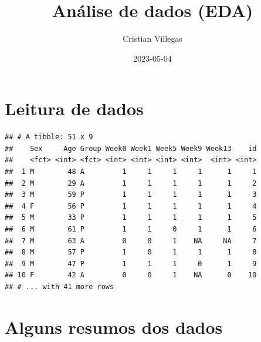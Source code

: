 \documentclass[
]{article}
\title{Análise de dados (EDA)}
\author{Cristian Villegas}
\date{2023-05-04}
\newenvironment{Shaded}{\begin{snugshade}}{\end{snugshade}}
\newcommand{\AttributeTok}[1]{\textcolor[rgb]{0.80,0.80,0.80}{#1}}
\newcommand{\ConstantTok}[1]{\textcolor[rgb]{0.86,0.64,0.64}{\textbf{#1}}}
\newcommand{\DecValTok}[1]{\textcolor[rgb]{0.86,0.86,0.80}{#1}}
\newcommand{\FunctionTok}[1]{\textcolor[rgb]{0.94,0.94,0.56}{#1}}
\newcommand{\NormalTok}[1]{\textcolor[rgb]{0.80,0.80,0.80}{#1}}
\newcommand{\OtherTok}[1]{\textcolor[rgb]{0.94,0.94,0.56}{#1}}
\newcommand{\SpecialCharTok}[1]{\textcolor[rgb]{0.86,0.64,0.64}{#1}}
\newcommand{\StringTok}[1]{\textcolor[rgb]{0.80,0.58,0.58}{#1}}
\begin{document}
\maketitle

{
\setcounter{tocdepth}{2}
\tableofcontents
}
\hypertarget{leitura-de-dados}{%
\section{Leitura de dados}\label{leitura-de-dados}}

\begin{Shaded}
\end{Shaded}

\begin{verbatim}
## # A tibble: 51 x 9
##    Sex     Age Group Week0 Week1 Week5 Week9 Week13    id
##    <fct> <int> <fct> <int> <int> <int> <int>  <int> <int>
##  1 M        48 A         1     1     1     1      1     1
##  2 M        29 A         1     1     1     1      1     2
##  3 M        59 P         1     1     1     1      1     3
##  4 F        56 P         1     1     1     1      1     4
##  5 M        33 P         1     1     1     1      1     5
##  6 M        61 P         1     1     0     1      1     6
##  7 M        63 A         0     0     1    NA     NA     7
##  8 M        57 P         1     0     1     1      1     8
##  9 M        47 P         1     1     1     0      1     9
## 10 F        42 A         0     0     1    NA      0    10
## # ... with 41 more rows
\end{verbatim}

\hypertarget{alguns-resumos-dos-dados}{%
\section{Alguns resumos dos dados}\label{alguns-resumos-dos-dados}}
\end{document}
